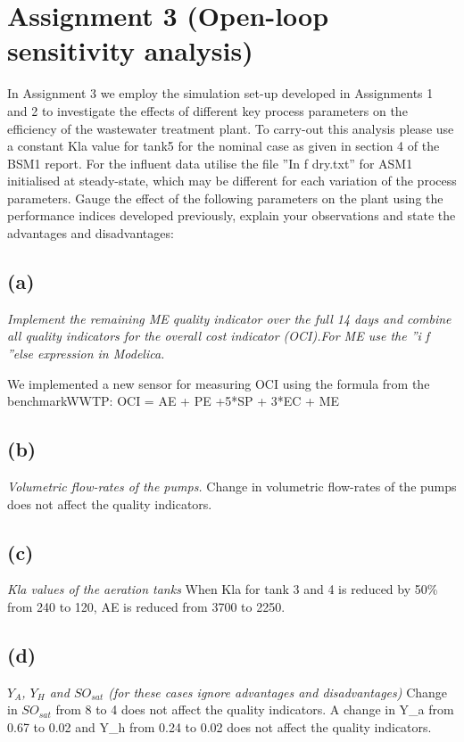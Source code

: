 \section*{Assignment 3 (Open-loop sensitivity analysis)}\label{sec:Assignment3}
In Assignment 3 we employ the simulation set-up developed in Assignments 1 and 2 to investigate
the effects of different key process parameters on the efficiency of the wastewater treatment plant.
To carry-out this analysis please use a constant Kla value for tank5 for the nominal case as given in
section 4 of the BSM1 report. For the influent data utilise the file ”In f dry.txt” for ASM1 initialised at steady-state, which may be different for each variation of the process parameters.
\newline
Gauge the effect of the following parameters on the plant using the performance indices developed
previously, explain your observations and state the advantages and disadvantages:

\subsection*{(a)}
\textit{Implement the remaining ME quality indicator over the full 14 days and combine all quality
indicators for the overall cost indicator (OCI).For ME use the ”i f ”else expression in Modelica.} \newline

We implemented a new sensor for measuring OCI using the formula from the benchmarkWWTP: \newline
OCI = AE + PE +5*SP + 3*EC + ME

\subsection*{(b)}
\textit{Volumetric flow-rates of the pumps.} \newline
Change in volumetric flow-rates of the pumps does not affect the quality indicators.

\subsection*{(c)}
\textit{Kla values of the aeration tanks} \newline
When Kla for tank 3 and 4 is reduced by 50\% from 240 to 120, AE is reduced from 3700 to 2250.

\subsection*{(d)}
\textit{$Y_A$, $Y_H$ and $SO_{sat}$ (for these cases ignore advantages and disadvantages)} \newline
Change in $SO_{sat}$ from 8 to 4 does not affect the quality indicators. A change in Y\_a from 0.67 to 0.02 and Y\_h from 0.24 to 0.02 does not affect the quality indicators.
